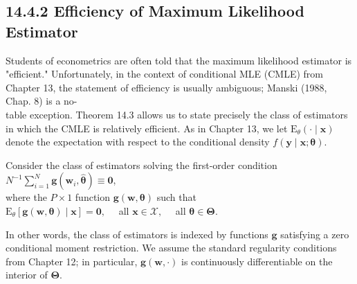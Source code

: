 \documentclass[10pt]{article}
\begin{document}
\subsection*{14.4.2 Efficiency of Maximum Likelihood Estimator}
Students of econometrics are often told that the maximum likelihood estimator is "efficient." Unfortunately, in the context of conditional MLE (CMLE) from Chapter 13, the statement of efficiency is usually ambiguous; Manski (1988, Chap. 8) is a no-\\
table exception. Theorem 14.3 allows us to state precisely the class of estimators in which the CMLE is relatively efficient. As in Chapter 13, we let $\mathrm{E}_{\theta}(\cdot \mid \mathbf{x})$ denote the expectation with respect to the conditional density $f(\mathbf{y} \mid \mathbf{x} ; \boldsymbol{\theta})$.

Consider the class of estimators solving the first-order condition\\
$N^{-1} \sum_{i=1}^{N} \mathbf{g}\left(\mathbf{w}_{i}, \hat{\boldsymbol{\theta}}\right) \equiv \mathbf{0}$,\\
where the $P \times 1$ function $\mathbf{g}(\mathbf{w}, \boldsymbol{\theta})$ such that\\
$\mathrm{E}_{\theta}[\mathbf{g}(\mathbf{w}, \boldsymbol{\theta}) \mid \mathbf{x}]=\mathbf{0}, \quad$ all $\mathbf{x} \in \mathscr{X}, \quad$ all $\boldsymbol{\theta} \in \boldsymbol{\Theta}$.

In other words, the class of estimators is indexed by functions $\mathbf{g}$ satisfying a zero conditional moment restriction. We assume the standard regularity conditions from Chapter 12; in particular, $\mathbf{g}(\mathbf{w}, \cdot)$ is continuously differentiable on the interior of $\boldsymbol{\Theta}$.
\end{document}
